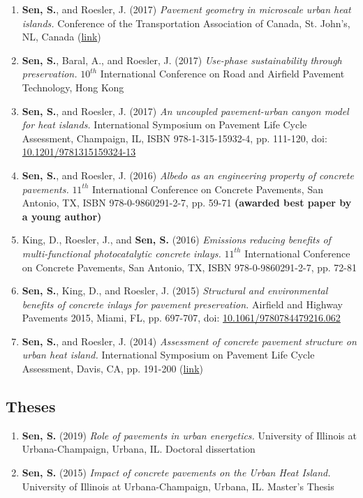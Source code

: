 \documentclass[12pt]{article}
\begin{document}
\begin{enumerate}
	\item \textbf{Sen, S.}, and Roesler, J. (2017) \textit{Pavement geometry in microscale urban heat islands.} Conference of the Transportation Association of Canada, St. John’s, NL, Canada (\href{http://www.tac-atc.ca/sites/default/files/conf_papers/sens_-_pavement_geometry_in_microscale_urban_heat_islands.pdf}{link})
	\item \textbf{Sen, S.}, Baral, A., and Roesler, J. (2017) \textit{Use-phase sustainability through preservation.} $10^{th}$ International Conference on Road and Airfield Pavement Technology, Hong Kong
	\item \textbf{Sen, S.}, and Roesler, J. (2017) \textit{An uncoupled pavement-urban canyon model for heat islands.} International Symposium on Pavement Life Cycle Assessment, Champaign, IL, ISBN 978-1-315-15932-4, pp. 111-120, doi: \href{http://dx.doi.org/10.1201/9781315159324-13}{10.1201/9781315159324-13}
	\item \textbf{Sen, S.}, and Roesler, J. (2016) \textit{Albedo as an engineering property of concrete pavements.} $11^{th}$ International Conference on Concrete Pavements, San Antonio, TX, ISBN 978-0-9860291-2-7, pp. 59-71 \textbf{(awarded best paper by a young author)}
	\item King, D., Roesler, J., and \textbf{Sen, S.} (2016) \textit{Emissions reducing benefits of multi-functional photocatalytic concrete inlays.} $11^{th}$ International Conference on Concrete Pavements, San Antonio, TX, ISBN 978-0-9860291-2-7, pp. 72-81
	\item \textbf{Sen, S.}, King, D., and Roesler, J. (2015) \textit{Structural and environmental benefits of concrete inlays for pavement preservation.} Airfield and Highway Pavements 2015, Miami, FL, pp. 697-707, doi: \href{http://dx.doi.org/10.1061/9780784479216.062}{10.1061/9780784479216.062}
	\item \textbf{Sen, S.}, and Roesler, J. (2014) \textit{Assessment of concrete pavement structure on urban heat island.} International Symposium on Pavement Life Cycle Assessment, Davis, CA, pp. 191-200 (\href{http://www.ucprc.ucdavis.edu/p-LCA2014/media/pdf/Papers/LCA14_Urban\%20Heat\%20Island.pdf}{link})
\end{enumerate}

\hfill
\subsection*{Theses}
\begin{enumerate}
	\item \textbf{Sen, S.} (2019) \textit{Role of pavements in urban energetics.} University of Illinois at Urbana-Champaign, Urbana, IL. Doctoral dissertation
	\item \textbf{Sen, S.} (2015) \textit{Impact of concrete pavements on the 		Urban Heat Island.} University of Illinois at Urbana-Champaign, Urbana, IL. Master’s Thesis
\end{enumerate}
\end{document}
